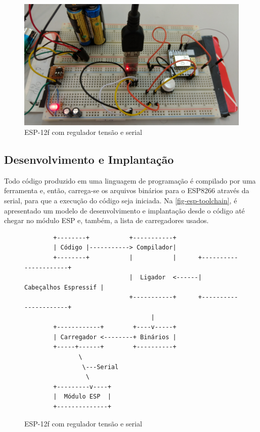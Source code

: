 \begin{figure}[htb]
	\caption{\label{fig-esp-pilha-serial}ESP-12f com regulador tensão e serial}
	\begin{center}
		\includegraphics[width=1\textwidth]{040-plataformas/esp-dev/breadboard.jpg}
	\end{center}
\end{figure}


\subsection{Desenvolvimento e Implantação}
\label{subsec:dev-esp}

Todo código produzido em uma linguagem de programação é compilado por uma
ferramenta e, então, carrega-se os arquivos binários para o ESP8266 através da
serial, para que a execução do código seja iniciada. Na
\autoref{fig-esp-toolchain}, é apresentado um modelo de desenvolvimento e
implantação desde o código até chegar no módulo ESP e, também, a lista de
carregadores usados.

\begin{figure}[htb]
	\caption{\label{fig-esp-toolchain}ESP-12f com regulador tensão e serial}
	\begin{center}
		\begin{verbatim}
		+--------+           +-----------+
		| Código |-----------> Compilador|
		+--------+           |           |      +----------------------+
		                     |  Ligador  <------| Cabeçalhos Espressif |
		                     +-----------+      +----------------------+
		                           |
		+------------+        +----v-----+
		| Carregador <--------+ Binários |
		+-----+------+        +----------+
		       \
		        \---Serial
		         \
		+---------v----+
		|  Módulo ESP  |
		+--------------+
		\end{verbatim}
	\end{center}
\end{figure}


